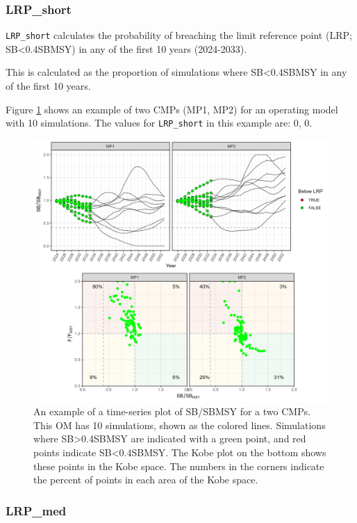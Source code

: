 \documentclass[
]{article}
\begin{document}
\hypertarget{lrp_short}{%
\subsubsection{LRP\_short}\label{lrp_short}}

\texttt{LRP\_short} calculates the probability of breaching the limit reference point (LRP; SB\textless0.4SBMSY) in any of the first 10 years (2024-2033).

This is calculated as the proportion of simulations where SB\textless0.4SBMSY in any of the first 10 years.

Figure \ref{fig:LRPshort} shows an example of two CMPs (MP1, MP2) for an operating model with 10 simulations. The values for \texttt{LRP\_short} in this example are: 0, 0.

\begin{figure}
\includegraphics[width=37.5in]{../../img/PMs/LRP_short} \caption{An example of a time-series plot of SB/SBMSY for a two CMPs. This OM has 10 simulations, shown as the colored lines. Simulations where SB>0.4SBMSY are indicated with a green point, and red points indicate SB<0.4SBMSY. The Kobe plot on the bottom shows these points in the Kobe space. The numbers in the corners indicate the percent of points in each area of the Kobe space.}\label{fig:LRPshort}
\end{figure}

\hypertarget{lrp_med}{%
\subsubsection{LRP\_med}\label{lrp_med}}
\end{document}
